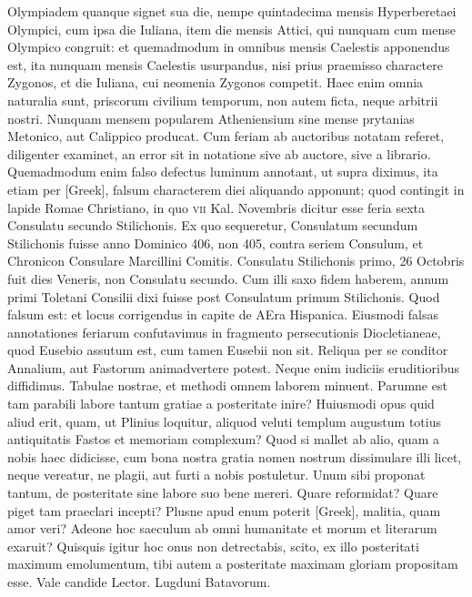 Olympiadem quanque signet sua die,
nempe quintadecima mensis Hyperberetaei Olympici, cum ipsa die
Iuliana, item die mensis Attici, qui nunquam cum mense Olympico
congruit: et quemadmodum in omnibus mensis Caelestis apponendus
est, ita nunquam mensis Caelestis usurpandus, nisi prius praemisso charactere
Zygonos, et die Iuliana, cui neomenia Zygonos competit.
Haec enim omnia naturalia sunt, priscorum civilium temporum, non
autem ficta, neque arbitrii nostri.
Nunquam mensem popularem Atheniensium
sine mense prytanias Metonico, aut Calippico producat.
Cum feriam ab auctoribus notatam referet, diligenter examinet, an
error sit in notatione sive ab auctore, sive a librario.
Quemadmodum
enim falso defectus luminum annotant, ut supra diximus, ita etiam
per \textgreek{[Greek]}, falsum characterem diei aliquando apponunt;
 quod contingit
in lapide Romae Christiano, in quo \textsc{vii} Kal. Novembris dicitur
esse feria sexta Consulatu secundo Stilichonis.
Ex quo sequeretur, Consulatum
secundum Stilichonis fuisse anno Dominico 406, non 405,
contra seriem Consulum, et Chronicon Consulare Marcillini Comitis.
Consulatu Stilichonis primo, 26 Octobris fuit dies Veneris,
non Consulatu secundo.
Cum illi saxo fidem haberem, annum primi
Toletani Consilii dixi fuisse post Consulatum primum Stilichonis.
Quod falsum est: et locus corrigendus in capite de AEra Hispanica.
Eiusmodi falsas annotationes feriarum confutavimus in fragmento
persecutionis Diocletianeae, quod Eusebio assutum est, cum tamen
Eusebii non sit.
Reliqua per se conditor Annalium, aut Fastorum animadvertere
potest.
Neque enim iudiciis eruditioribus diffidimus.
Tabulae nostrae, et methodi omnem laborem minuent.
Parumne est
tam parabili labore tantum gratiae a posteritate inire?
Huiusmodi
opus quid aliud erit, quam, ut Plinius loquitur, aliquod veluti templum
augustum totius antiquitatis Fastos et memoriam complexum?
Quod si mallet ab alio, quam a nobis haec didicisse, cum bona nostra
gratia nomen nostrum dissimulare illi licet, neque vereatur, ne
plagii, aut furti a nobis postuletur.
Unum sibi proponat tantum, de
posteritate sine labore suo bene mereri.
Quare reformidat?
Quare piget tam praeclari incepti?
Plusne apud enum poterit \textgreek{[Greek]}, malitia,
quam amor veri?
Adeone hoc saeculum ab omni humanitate et
morum et literarum exaruit?
Quisquis igitur hoc onus non detrectabis,
scito, ex illo posteritati maximum emolumentum, tibi autem
a posteritate maximam gloriam propositam esse.
Vale candide
Lector.
Lugduni Batavorum.
%
